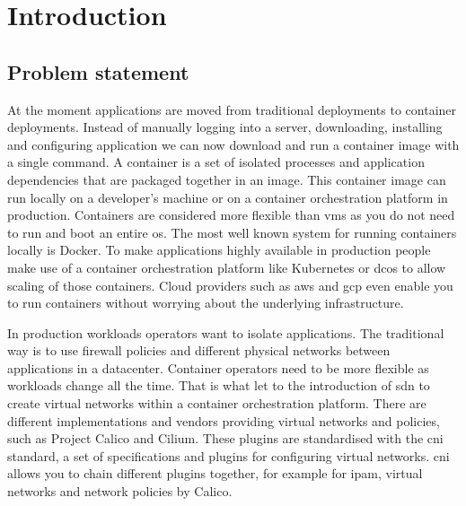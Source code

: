 \chapter{Introduction}
\label{chap:introduction}

\section{Problem statement}
\label{sec:problem-statement}
At the moment applications are moved from traditional deployments to container deployments. Instead of manually logging into a server, downloading, installing and configuring application we can now download and run a container image with a single command. A container is a set of isolated processes and application dependencies that are packaged together in an image. This container image can run locally on a developer's machine or on a container orchestration platform in production. Containers are considered more flexible than \glspl{vm} as you do not need to run and boot an entire \gls{os}. The most well known system for running containers locally is Docker\cite{docker}. To make applications highly available in production people make use of a container orchestration platform like Kubernetes\cite{kubernetes} or \gls{dcos}\cite{dcos} to allow scaling of those containers. Cloud providers such as \gls{aws}\cite{aws} and \gls{gcp}\cite{gcp} even enable you to run containers without worrying about the underlying infrastructure.

In production workloads operators want to isolate applications. The traditional way is to use firewall policies and different physical networks between applications in a datacenter. Container operators need to be more flexible as workloads change all the time. That is what let to the introduction of \gls{sdn} to create virtual networks within a container orchestration platform. There are different implementations and vendors providing virtual networks and policies, such as Project Calico\cite{calico} and Cilium\cite{cilium}. These plugins are standardised with the \gls{cni}\cite{cni} standard, a set of specifications and plugins for configuring virtual networks. \Gls{cni} allows you to chain different plugins together, for example for \gls{ipam}, virtual networks and network policies by Calico.

